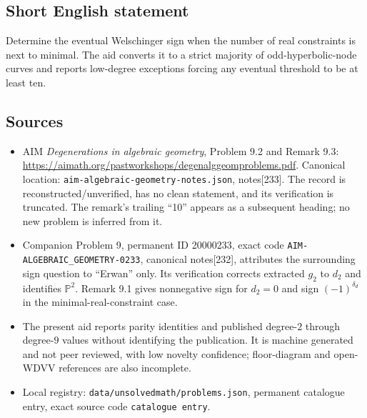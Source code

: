 \documentclass[11pt]{article}
\newcommand{\PP}{\mathbb{P}}
\begin{document}
\subsection{Short English statement}
Determine the eventual Welschinger sign when the number of real constraints is next to minimal. The aid converts it to a strict majority of odd-hyperbolic-node curves and reports low-degree exceptions forcing any eventual threshold to be at least ten.
\subsection{Sources}
\begin{itemize}
\item AIM \emph{Degenerations in algebraic geometry}, Problem 9.2 and Remark 9.3: \url{https://aimath.org/pastworkshops/degenalggeomproblems.pdf}. Canonical location: \texttt{aim-algebraic-geometry-notes.json}, notes[233]. The record is reconstructed/unverified, has no clean statement, and its verification is truncated. The remark's trailing ``10'' appears as a subsequent heading; no new problem is inferred from it.
\item Companion Problem 9, permanent ID 20000233, exact code \texttt{AIM-ALGEBRAIC\_GEOMETRY-0233}, canonical notes[232], attributes the surrounding sign question to ``Erwan'' only. Its verification corrects extracted $g_2$ to $d_2$ and identifies $\PP^2$. Remark 9.1 gives nonnegative sign for $d_2=0$ and sign $(-1)^{\delta_d}$ in the minimal-real-constraint case.
\item The present aid reports parity identities and published degree-$2$ through degree-$9$ values without identifying the publication. It is machine generated and not peer reviewed, with low novelty confidence; floor-diagram and open-WDVV references are also incomplete.
\item Local registry: \texttt{data/unsolvedmath/problems.json}, permanent catalogue entry, exact source code \texttt{catalogue entry}.
\end{itemize}
\end{document}
